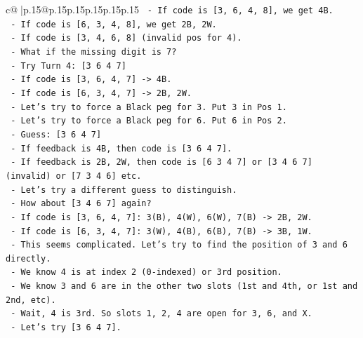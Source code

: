\documentclass{article}
\begin{document}
{\begin{supertabular}{c@{$\;$}|p{.15\linewidth}@{}p{.15\linewidth}p{.15\linewidth}p{.15\linewidth}p{.15\linewidth}p{.15\linewidth}}
{{{\texttt{                      {-} If code is {[}3, 6, 4, 8{]}, we get 4B.} \\
\texttt{                      {-} If code is {[}6, 3, 4, 8{]}, we get 2B, 2W.} \\
\texttt{                      {-} If code is {[}3, 4, 6, 8{]} (invalid pos for 4).} \\
\texttt{                    {-} What if the missing digit is 7?} \\
\texttt{                    {-} Try Turn 4: {[}3 6 4 7{]}} \\
\texttt{                      {-} If code is {[}3, 6, 4, 7{]} {-}> 4B.} \\
\texttt{                      {-} If code is {[}6, 3, 4, 7{]} {-}> 2B, 2W.} \\
\texttt{                    {-} Let's try to force a Black peg for 3. Put 3 in Pos 1.} \\
\texttt{                    {-} Let's try to force a Black peg for 6. Put 6 in Pos 2.} \\
\texttt{                    {-} Guess: {[}3 6 4 7{]}} \\
\texttt{                    {-} If feedback is 4B, then code is {[}3 6 4 7{]}.} \\
\texttt{                    {-} If feedback is 2B, 2W, then code is {[}6 3 4 7{]} or {[}3 4 6 7{]} (invalid) or {[}7 3 4 6{]} etc.} \\
\texttt{                    {-} Let's try a different guess to distinguish.} \\
\texttt{                    {-} How about {[}3 4 6 7{]} again?} \\
\texttt{                      {-} If code is {[}3, 6, 4, 7{]}: 3(B), 4(W), 6(W), 7(B) {-}> 2B, 2W.} \\
\texttt{                      {-} If code is {[}6, 3, 4, 7{]}: 3(W), 4(B), 6(B), 7(B) {-}> 3B, 1W.} \\
\texttt{                    {-} This seems complicated. Let's try to find the position of 3 and 6 directly.} \\
\texttt{                    {-} We know 4 is at index 2 (0{-}indexed) or 3rd position.} \\
\texttt{                    {-} We know 3 and 6 are in the other two slots (1st and 4th, or 1st and 2nd, etc).} \\
\texttt{                    {-} Wait, 4 is 3rd. So slots 1, 2, 4 are open for 3, 6, and X.} \\
\texttt{                    {-} Let's try {[}3 6 4 7{]}.} \\
}}}
\end{supertabular}}
\end{document}
